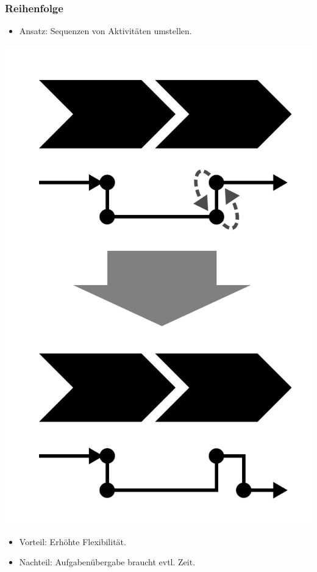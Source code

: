 \documentclass{beamer}
\begin{document}
 \begin{frame}
  \frametitle{Reihenfolge}
    \begin{itemize}
    \item Ansatz: Sequenzen von Aktivitäten umstellen.
  \end{itemize}
  \centerline{\includegraphics[scale=2.5]{4_6_6.png}}
  \begin{itemize}
    \item Vorteil: Erhöhte Flexibilität.
    \item Nachteil: Aufgabenübergabe braucht evtl. Zeit.
  \end{itemize}
 \end{frame}
\end{document}
